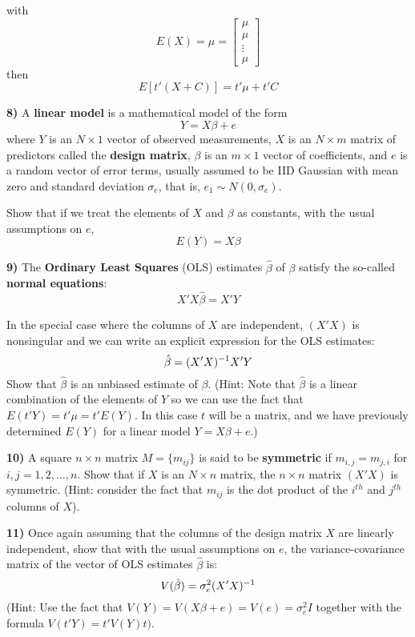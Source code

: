 \documentclass{amsart}
\begin{document}
with
\[
E(X) = \mu = \left[\begin{array}{c}\mu\\\mu\\\vdots\\\mu\end{array}\right]
\]
then
\[
E[t'(X+C)] = t'\mu + t'C
\]
\par\vspace{1 cm}\noindent
\textbf{8)}  A \textbf{linear model} is a mathematical model of the form
\[
Y = X\beta + e
\]
where $Y$ is an $N\times1$ vector of observed measurements, $X$ is an $N\times m$ matrix of predictors called the \textbf{design matrix}, $\beta$ is an $m\times1$ vector of coefficients, and $e$ is a random vector of error terms, usually assumed to be IID Gaussian with mean zero and standard deviation $\sigma_e$, that is, $e_1\sim N(0,\sigma_e)$.
\par\vspace{0.4 cm}
Show that if we treat the elements of $X$ and $\beta$ as constants, with the usual assumptions on $e$,
\[
E(Y) = X\beta
\]
\par\vspace{1 cm}\noindent
\textbf{9)} The \textbf{Ordinary Least Squares} (OLS) estimates $\hat{\beta}$ of $\beta$ satisfy the so-called \textbf{normal equations}:
\[
X'X\hat{\beta} = X'Y 
\]
\par\vspace{0.4 cm}
In the special case where the columns of $X$ are independent, $(X'X)$ is nonsingular and we can write an explicit expression for the OLS estimates:
\[
\hat{\beta} = (X'X)^{-1}X'Y
\vspace{0.4 cm}
\] 
Show that $\hat{\beta}$ is an unbiased estimate of $\beta$. (Hint: Note that $\hat{\beta}$ is a linear combination of the elements of $Y$ so we can use the fact that $E(t'Y) = t'\mu = t'E(Y)$.  In this case $t$ will be a matrix, and we have previously determined $E(Y)$ for a linear model $Y=X\beta+e$.) 
\par\vspace{1 cm}\noindent
\textbf{10)} A square $n\times n$ matrix $M = \{m_{ij}\}$ is said to be \textbf{symmetric} if $m_{i,j}=m_{j,i}$ for $i,j=1,2,\ldots,n$.  Show that if $X$ is an $N\times n$ matrix, the $n\times n$ matrix $(X'X)$ is symmetric.  (Hint: consider the fact that $m_{ij}$ is the dot product of the $i^{th}$ and $j^{th}$ columns of $X$).  

\par\vspace{1 cm}\noindent
\textbf{11)} Once again assuming that the columns of the design matrix $X$ are linearly independent, show that with the usual assumptions on $e$, the variance-covariance matrix of the vector of OLS estimates $\hat{\beta}$ is:
\[
V(\hat{\beta}) = \sigma^2_e(X'X)^{-1} 
\vspace{0.4 cm}
\]
(Hint: Use the fact that $V(Y) = V(X\beta+e) = V(e) = \sigma^2_eI$ together with the formula $V(t'Y) = t'V(Y)t)$.
\end{document}
